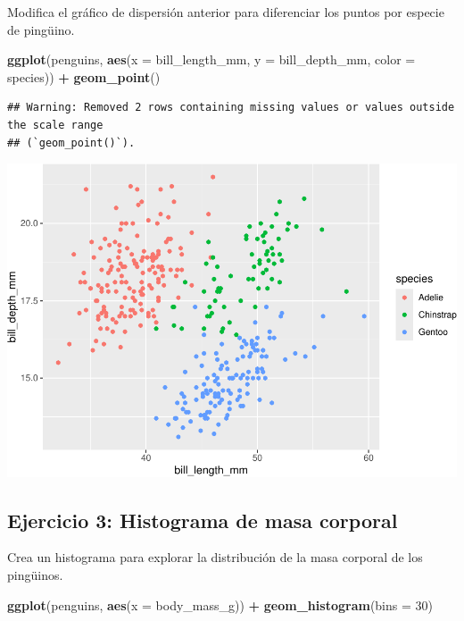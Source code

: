\documentclass[
]{book}
\newenvironment{Shaded}{\begin{snugshade}}{\end{snugshade}}
\newcommand{\AttributeTok}[1]{\textcolor[rgb]{0.13,0.29,0.53}{#1}}
\newcommand{\DecValTok}[1]{\textcolor[rgb]{0.00,0.00,0.81}{#1}}
\newcommand{\FunctionTok}[1]{\textcolor[rgb]{0.13,0.29,0.53}{\textbf{#1}}}
\newcommand{\NormalTok}[1]{#1}
\newcommand{\SpecialCharTok}[1]{\textcolor[rgb]{0.81,0.36,0.00}{\textbf{#1}}}
\begin{document}
Modifica el gráfico de dispersión anterior para diferenciar los puntos por especie de pingüino.

\begin{Shaded}
\begin{Highlighting}[]
\FunctionTok{ggplot}\NormalTok{(penguins, }\FunctionTok{aes}\NormalTok{(}\AttributeTok{x =}\NormalTok{ bill\_length\_mm, }\AttributeTok{y =}\NormalTok{ bill\_depth\_mm, }\AttributeTok{color =}\NormalTok{ species)) }\SpecialCharTok{+}
  \FunctionTok{geom\_point}\NormalTok{()}
\end{Highlighting}
\end{Shaded}

\begin{verbatim}
## Warning: Removed 2 rows containing missing values or values outside the scale range
## (`geom_point()`).
\end{verbatim}

\includegraphics{bookdown-demo_files/figure-latex/unnamed-chunk-201-1.pdf}

\hypertarget{ejercicio-3-histograma-de-masa-corporal-1}{%
\subsection{Ejercicio 3: Histograma de masa corporal}\label{ejercicio-3-histograma-de-masa-corporal-1}}

Crea un histograma para explorar la distribución de la masa corporal de los pingüinos.

\begin{Shaded}
\begin{Highlighting}[]
\FunctionTok{ggplot}\NormalTok{(penguins, }\FunctionTok{aes}\NormalTok{(}\AttributeTok{x =}\NormalTok{ body\_mass\_g)) }\SpecialCharTok{+}
  \FunctionTok{geom\_histogram}\NormalTok{(}\AttributeTok{bins =} \DecValTok{30}\NormalTok{)}
\end{Highlighting}
\end{Shaded}
\end{document}

